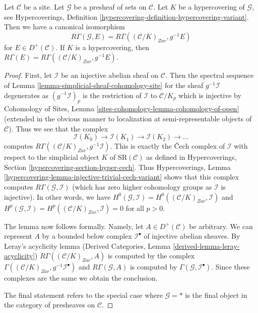 \begin{lemma}
\label{lemma-compare-cohomology-hypercovering}
Let $\mathcal{C}$ be a site. Let $\mathcal{G}$ be a presheaf of sets on
$\mathcal{C}$. Let $K$ be a hypercovering of $\mathcal{G}$, see
Hypercoverings, Definition
\ref{hypercovering-definition-hypercovering-variant}.
Then we have a canonical isomorphism
$$
R\Gamma(\mathcal{G}, E) =
R\Gamma((\mathcal{C}/K)_{Zar}, g^{-1}E)
$$
for $E \in D^+(\mathcal{C})$. If $K$ is a
hypercovering, then
$R\Gamma(E) = R\Gamma((\mathcal{C}/K)_{Zar}, g^{-1}E)$.
\end{lemma}

\begin{proof}
First, let $\mathcal{I}$ be an injective abelian sheaf on $\mathcal{C}$.
Then the spectral sequence of
Lemma \ref{lemma-simplicial-sheaf-cohomology-site}
for the sheaf $g^{-1}\mathcal{I}$ degenerates as
$(g^{-1}\mathcal{I})_p$ is the restriction of $\mathcal{I}$
to $\mathcal{C}/K_p$ which is injective by
Cohomology of Sites, Lemma \ref{sites-cohomology-lemma-cohomology-of-open}
(extended in the obvious manner to localization at
semi-representable objects of $\mathcal{C}$).
Thus we see that the complex
$$
\mathcal{I}(K_0) \to \mathcal{I}(K_1) \to \mathcal{I}(K_2) \to \ldots
$$
computes $R\Gamma((\mathcal{C}/K)_{Zar}, g^{-1}\mathcal{I})$.
This is exactly the {\v C}ech complex of $\mathcal{I}$ with respect
to the simplicial object $K$ of $\text{SR}(\mathcal{C})$ as defined in
Hypercoverings, Section \ref{hypercovering-section-hyper-cech}.
Thus
Hypercoverings, Lemma \ref{hypercovering-lemma-injective-trivial-cech-variant}
shows that this complex computes $R\Gamma(\mathcal{G}, \mathcal{I})$
(which has zero higher cohomology groups as $\mathcal{I}$ is injective).
In other words, we have
$H^0(\mathcal{G}, \mathcal{I}) = H^0((\mathcal{C}/K)_{Zar}, \mathcal{I})$
and
$H^p(\mathcal{G}, \mathcal{I}) = H^p((\mathcal{C}/K)_{Zar}, \mathcal{I}) = 0$
for all $p > 0$.

\medskip\noindent
The lemma now follows formally. Namely, let $A \in D^+(\mathcal{C})$
be arbitrary. We can represent $A$ by a bounded below complex
$\mathcal{I}^\bullet$ of injective abelian sheaves. By Leray's acyclicity
lemma (Derived Categories, Lemma \ref{derived-lemma-leray-acyclicity})
$R\Gamma((\mathcal{C}/K)_{Zar}, A)$
is computed by the complex
$\Gamma((\mathcal{C}/K)_{Zar}, g^{-1}\mathcal{I}^\bullet)$
and $R\Gamma(\mathcal{G}, A)$ is computed by
$\Gamma(\mathcal{G}, \mathcal{I}^\bullet)$.
Since these complexes are the same we obtain the conclusion.

\medskip\noindent
The final statement refers to the special case where $\mathcal{G} = *$
is the final object in the category of presheaves on $\mathcal{C}$.
\end{proof}

